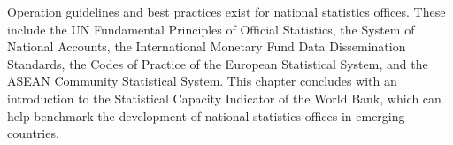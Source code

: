 Operation guidelines and best practices exist for national statistics offices. These include the UN Fundamental Principles of Official Statistics, the System of National Accounts, the International Monetary Fund Data Dissemination Standards, the Codes of Practice of the European Statistical System, and the ASEAN Community Statistical System. This chapter concludes with an introduction to the Statistical Capacity Indicator of the World Bank, which can help benchmark the development of national statistics offices in emerging countries.